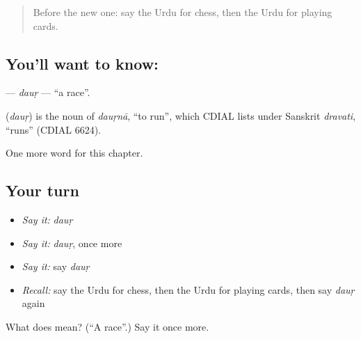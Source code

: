 \label{lesson:UR-C201-daur}



\begin{quote}
Before the new one: say the Urdu for chess, then the Urdu for playing cards.
\end{quote}

\subsection*{You'll want to know: }
\textbf{} — \emph{dauṛ} — \textquotedblleft{}a race\textquotedblright{}.

\begin{cousinweb}
\textbf{} (\emph{dauṛ}) is the noun of \emph{dauṛnā}, \textquotedblleft{}to run\textquotedblright{}, which CDIAL lists under Sanskrit \emph{dravati}, \textquotedblleft{}runs\textquotedblright{} (CDIAL 6624).
\end{cousinweb}

\begin{grammarlens}[title={What you've built}]
One more word for this chapter.
\end{grammarlens}

\subsection*{Your turn}
\begin{itemize}
\raggedright
  \item \emph{Say it:} \emph{dauṛ}
  \item \emph{Say it:} \emph{dauṛ}, once more
  \item \emph{Say it:} say \emph{dauṛ}
  \item \emph{Recall:} say the Urdu for chess, then the Urdu for playing cards, then say \emph{dauṛ} again
\end{itemize}

\begin{tcolorbox}[breakable,colback=teal!4,colframe=teal!35!black,title={Before you move on}]
What does  mean? (\textquotedblleft{}A race\textquotedblright{}.) Say it once more.
\end{tcolorbox}
